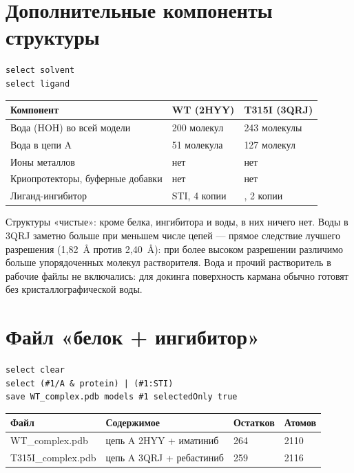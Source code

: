 \documentclass[12pt,a4paper]{article}
\newcommand{\code}[1]{{\ttfamily #1}}
\begin{document}
\section{Дополнительные компоненты структуры}

\begin{verbatim}
select solvent
select ligand
\end{verbatim}

\begin{center}
\begin{tabular}{L{4.6cm}L{5.0cm}L{5.0cm}}
\toprule
\textbf{Компонент} & \textbf{WT (2HYY)} & \textbf{T315I (3QRJ)} \\
\midrule
Вода (\code{HOH}) во всей модели & 200 молекул & 243 молекулы \\
Вода в цепи A & 51 молекула & 127 молекул \\
Ионы металлов & нет & нет \\
Криопротекторы, буферные добавки & нет & нет \\
Лиганд-ингибитор & \code{STI}, 4 копии & \code{919}, 2 копии \\
\bottomrule
\end{tabular}
\end{center}

\noindent Структуры «чистые»: кроме белка, ингибитора и воды, в них ничего нет. Воды
в 3QRJ заметно больше при меньшем числе цепей --- прямое следствие лучшего разрешения
(1{,}82~\AA{} против 2{,}40~\AA): при более высоком разрешении различимо больше
упорядоченных молекул растворителя. Вода и прочий растворитель в рабочие файлы не
включались: для докинга поверхность кармана обычно готовят без кристаллографической
воды.

\section{Файл «белок + ингибитор»}

\begin{verbatim}
select clear
select (#1/A & protein) | (#1:STI)
save WT_complex.pdb models #1 selectedOnly true
\end{verbatim}

\begin{center}
\begin{tabular}{L{4.6cm}L{4.1cm}L{2.3cm}L{2.3cm}}
\toprule
\textbf{Файл} & \textbf{Содержимое} & \textbf{Остатков} & \textbf{Атомов} \\
\midrule
\code{WT\_complex.pdb} & цепь A 2HYY + иматиниб & 264 & 2110 \\
\code{T315I\_complex.pdb} & цепь A 3QRJ + ребастиниб & 259 & 2116 \\
\bottomrule
\end{tabular}
\end{center}
\end{document}
